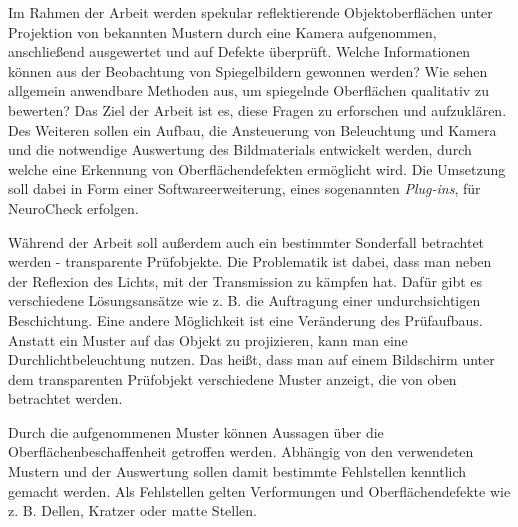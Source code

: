\p
Im Rahmen der Arbeit werden spekular reflektierende Objektoberflächen unter Projektion von bekannten Mustern durch eine Kamera aufgenommen, anschließend ausgewertet und auf Defekte überprüft.
Welche Informationen können aus der Beobachtung von Spiegelbildern gewonnen werden?
Wie sehen allgemein anwendbare Methoden aus, um spiegelnde Oberflächen qualitativ zu bewerten?
Das Ziel der Arbeit ist es, diese Fragen zu erforschen und aufzuklären.
Des Weiteren sollen ein Aufbau, die Ansteuerung von Beleuchtung und Kamera und die notwendige Auswertung des Bildmaterials entwickelt werden, durch welche eine Erkennung von Oberflächendefekten ermöglicht wird.
Die Umsetzung soll dabei in Form einer Softwareerweiterung, eines sogenannten \textit{Plug-ins}, für NeuroCheck erfolgen.

\p
Während der Arbeit soll außerdem auch ein bestimmter Sonderfall betrachtet werden - transparente Prüfobjekte.
Die Problematik ist dabei, dass man neben der Reflexion des Lichts, mit der Transmission zu kämpfen hat.
Dafür gibt es verschiedene Lösungsansätze wie z. B. die Auftragung einer undurchsichtigen Beschichtung.
Eine andere Möglichkeit ist eine Veränderung des Prüfaufbaus.
Anstatt ein Muster auf das Objekt zu projizieren, kann man eine Durchlichtbeleuchtung nutzen.
Das heißt, dass man auf einem Bildschirm unter dem transparenten Prüfobjekt verschiedene Muster anzeigt, die von oben betrachtet werden.

\p
Durch die aufgenommenen Muster können Aussagen über die Oberflächenbeschaffenheit getroffen werden.
Abhängig von den verwendeten Mustern und der Auswertung sollen damit bestimmte Fehlstellen kenntlich gemacht werden.
Als Fehlstellen gelten Verformungen und Oberflächendefekte wie z. B. Dellen, Kratzer oder matte Stellen.
